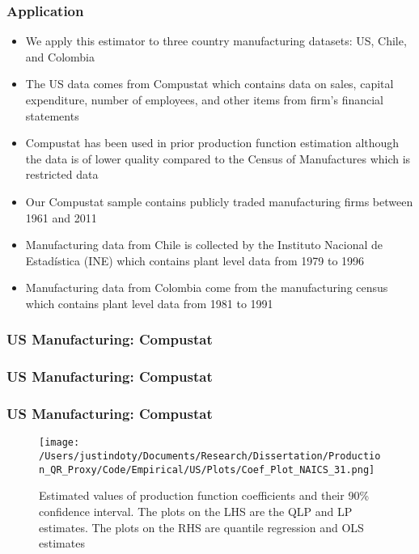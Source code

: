 \documentclass{beamer}
\begin{document}
\begin{frame}
\frametitle{Application}
\begin{itemize}
	\item We apply this estimator to three country manufacturing datasets: US, Chile, and Colombia
	\item The US data comes from Compustat which contains data on sales, capital expenditure, number of employees, and other items from firm's financial statements
	\item Compustat has been used in prior production function estimation although the data is of lower quality compared to the Census of Manufactures which is restricted data
	\item Our Compustat sample contains publicly traded manufacturing firms between 1961 and 2011
	\item Manufacturing data from Chile is collected by the Instituto Nacional de Estad\'{i}stica (INE) which contains plant level data from 1979 to 1996
	\item Manufacturing data from Colombia come from the manufacturing census which contains plant level data from 1981 to 1991 
\end{itemize}
\end{frame}


\begin{frame}
\frametitle{US Manufacturing: Compustat}
\scriptsize

\end{frame}

\begin{frame}
\frametitle{US Manufacturing: Compustat}
\scriptsize

\end{frame}

\begin{frame}
\frametitle{US Manufacturing: Compustat}
\begin{figure}[ht]
\centering
\texttt{[image: /Users/justindoty/Documents/Research/Dissertation/Production\_QR\_Proxy/Code/Empirical/US/Plots/Coef\_Plot\_NAICS\_31.png]}
\caption{Estimated values of production function coefficients and their 90\% confidence interval. The plots on the LHS are the QLP and LP estimates. The plots on the RHS are quantile regression and OLS estimates}
\end{figure}
\end{frame}
\end{document}
